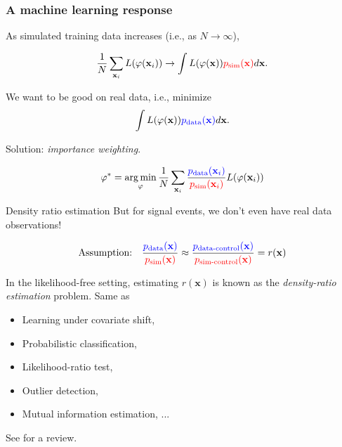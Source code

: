 \documentclass{beamer}
\DeclareMathOperator*{\argmin}{arg\,min}
\begin{document}

\begin{frame}
\frametitle{A machine learning response}

As simulated training data increases (i.e., as $N \to \infty$),

$$\frac{1}{N} \sum_{\mathbf{x}_i} L(\varphi(\mathbf{x}_i)) \to \int L(\varphi(\mathbf{x})) {\color{red} p_\text{sim}(\mathbf{x})} d\mathbf{x}.$$

We want to be good on real data, i.e., minimize
$$\int L(\varphi(\mathbf{x})) {\color{blue} p_\text{data}(\mathbf{x})} d\mathbf{x}.$$

Solution: {\it importance weighting}.

$$\varphi^* = \argmin_\varphi \frac{1}{N} \sum_{\mathbf{x}_i} \frac{\color{blue} p_\text{data}(\mathbf{x}_i)}{\color{red} p_\text{sim}(\mathbf{x}_i)}  L(\varphi(\mathbf{x}_i))$$

\end{frame}


\begin{frame}{Density ratio estimation}
But for signal events, we don't even have real data observations!

$$\text{Assumption:}\quad \frac{\color{blue} p_\text{data}(\mathbf{x})}{\color{red} p_\text{sim}(\mathbf{x})} \approx \frac{\color{blue} p_\text{data-control}(\mathbf{x})}{\color{red} p_\text{sim-control}(\mathbf{x})} = r(\mathbf{x}) $$

\vspace{1cm}

In the likelihood-free setting, estimating $r(\mathbf{x})$ is known as the {\it
density-ratio estimation} problem. Same as
\begin{itemize}
    \item Learning under covariate shift,
    \item Probabilistic classification,
    \item Likelihood-ratio test,
    \item Outlier detection,
    \item Mutual information estimation, ...
\end{itemize}
See \cite{sugiyama2012density} for a review.
\end{frame}

\end{document}
